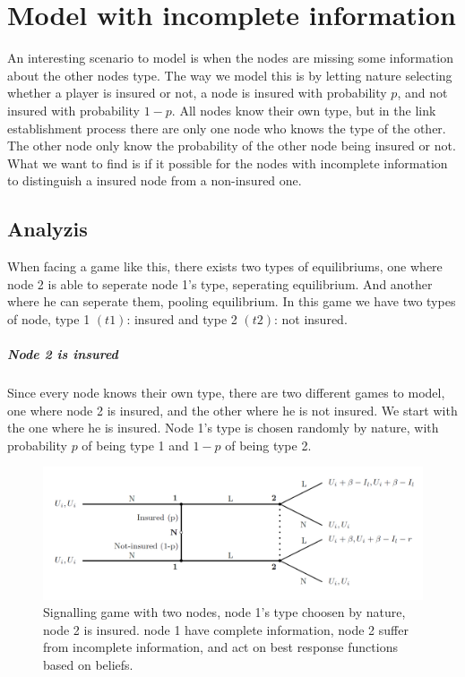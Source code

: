 \section{Model with incomplete information}
An interesting scenario to model is when the nodes are missing some information about the other nodes type. The way we model this is by letting nature selecting whether a player is insured or not, a node is insured with probability $p$, and not insured with probability $1-p$. 
All nodes know their own type, but in the link establishment process there are only one node who knows the type of the other. The other node only know the probability of the other node being insured or not. 
What we want to find is if it possible for the nodes with incomplete information to distinguish a insured node from a non-insured one.
\subsection{Analyzis}
When facing a game like this, there exists two types of equilibriums, one where node 2 is able to seperate node 1's type, seperating equilibrium. And another where he can seperate them, pooling equilibrium. 
In this game we have two types of node, type 1 $(t1)$: insured and type 2 $(t2)$: not insured. 
\subparagraph{Node 2 is insured}
Since every node knows their own type, there are two different games to model, one where node 2 is insured, and the other where he is not insured. We start with the one where he is insured.
Node 1's type is chosen randomly by nature, with probability $p$ of being type 1 and $1-p$ of being type 2.
\begin{figure}[h]
\centering
  \centering
\includegraphics[width=1\linewidth]{../Figures/SignalingGameInsured.png}

\caption{Signalling game with two nodes, node 1's type choosen by nature, node 2 is insured. node 1 have complete information, node 2 suffer from incomplete information, and act on best response functions based on beliefs. \label{fig:signalingInsured}}

\end{figure}


